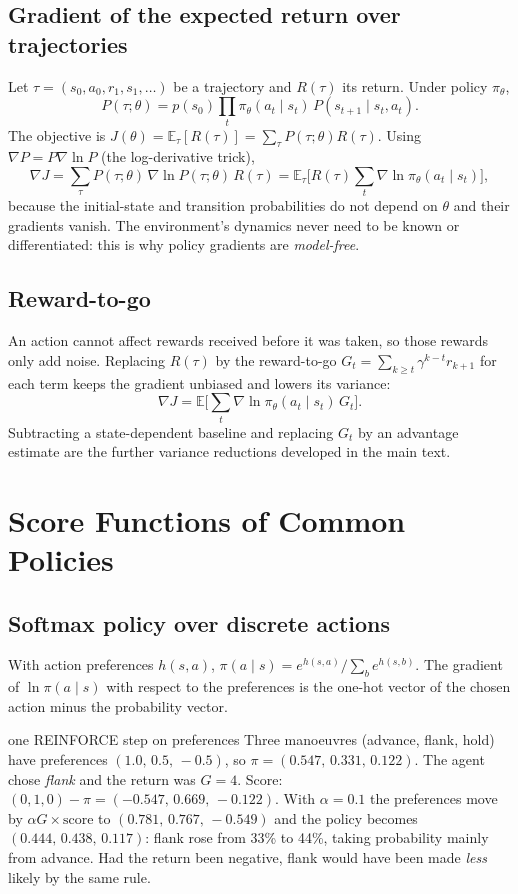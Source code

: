 \documentclass[11pt]{article}
\begin{document}
\subsection{Gradient of the expected return over trajectories}
Let $\tau=(s_0,a_0,r_1,s_1,\ldots)$ be a trajectory and $R(\tau)$ its return. Under policy $\pi_\theta$,
\[P(\tau;\theta)=p(s_0)\prod_t\pi_\theta(a_t\mid s_t)\,P(s_{t+1}\mid s_t,a_t).\]
The objective is $J(\theta)=\mathbb E_\tau[R(\tau)]=\sum_\tau P(\tau;\theta)R(\tau)$. Using $\nabla P=P\nabla\ln P$ (the log-derivative trick),
\[\nabla J=\sum_\tau P(\tau;\theta)\,\nabla\ln P(\tau;\theta)\,R(\tau)=\mathbb E_\tau\Big[R(\tau)\sum_t\nabla\ln\pi_\theta(a_t\mid s_t)\Big],\]
because the initial-state and transition probabilities do not depend on $\theta$ and their gradients vanish. The environment's dynamics never need to be known or differentiated: this is why policy gradients are \emph{model-free}.
\subsection{Reward-to-go}
An action cannot affect rewards received before it was taken, so those rewards only add noise. Replacing $R(\tau)$ by the reward-to-go $G_t=\sum_{k\ge t}\gamma^{k-t}r_{k+1}$ for each term keeps the gradient unbiased and lowers its variance:
\[\nabla J=\mathbb E\Big[\sum_t\nabla\ln\pi_\theta(a_t\mid s_t)\,G_t\Big].\]
Subtracting a state-dependent baseline and replacing $G_t$ by an advantage estimate are the further variance reductions developed in the main text.

\section{Score Functions of Common Policies}
\subsection{Softmax policy over discrete actions}
With action preferences $h(s,a)$, $\pi(a\mid s)=e^{h(s,a)}/\sum_be^{h(s,b)}$. The gradient of $\ln\pi(a\mid s)$ with respect to the preferences is the one-hot vector of the chosen action minus the probability vector.
\begin{example}{one REINFORCE step on preferences}
Three manoeuvres (advance, flank, hold) have preferences $(1.0,\,0.5,\,-0.5)$, so $\pi=(0.547,\,0.331,\,0.122)$. The agent chose \emph{flank} and the return was $G=4$. Score: $(0,1,0)-\pi=(-0.547,\,0.669,\,-0.122)$. With $\alpha=0.1$ the preferences move by $\alpha G\times\text{score}$ to $(0.781,\,0.767,\,-0.549)$ and the policy becomes $(0.444,\,0.438,\,0.117)$: flank rose from 33\% to 44\%, taking probability mainly from advance. Had the return been negative, flank would have been made \emph{less} likely by the same rule.
\end{example}
\end{document}
